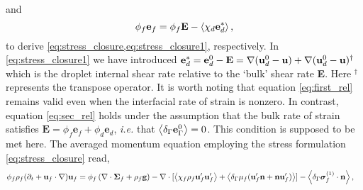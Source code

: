 and
\begin{equation}
\phi _f\textbf{e}_f
    = 
    \phi_f \textbf{E}
    - \avg{\chi_d \textbf{e}_d^*},
    \label{eq:sec_rel}
\end{equation}
to derive \ref{eq:stress_closure,eq:stress_closure1}, respectively. 
In \ref{eq:stress_closure1} we have introduced $\textbf{e}_d^* = \textbf{e}_d^0 - \textbf{E} = \mathbf{\nabla} (\textbf{u}_d^0-\textbf{u})+\mathbf{\nabla} (\textbf{u}_d^0-\textbf{u})^\dagger$ which is the droplet internal shear rate relative to the `bulk' shear rate \textbf{E}.
Here $^\dagger$ represents the transpose operator. 
It is worth noting that equation \ref{eq:first_rel} remains valid even when the interfacial rate of strain is nonzero. 
In contrast, equation \ref{eq:sec_rel} holds under the assumption that the bulk rate of strain satisfies $\textbf{E} = \phi_f \textbf{e}_f + \phi_d \textbf{e}_d$, \textit{i.e.} that $\left<\delta_\Gamma \textbf{e}_\Gamma^0\right> = 0$. 
This condition is supposed to be met here.
The averaged momentum equation  employing the stress formulation \ref{eq:stress_closure} read, 
\begin{align}
    \phi_f \rho_f(\pddt + \textbf{u}_f  \cdot \grad) \textbf{u}_f
    &= \phi_f 
    \left(\div \bm{\Sigma}_f
    + \rho_f \textbf{g}\right)
    - \div 
    [\avg{\chi_f\rho_f \textbf{u}_f'\textbf{u}_f'}
    +\avg{\delta_\Gamma \mu_f( \textbf{u}_f'  \textbf{n} +  \textbf{n} \textbf{u}_f')}]
    - \avg{\delta_\Gamma \bm\sigma_f^{(1)}\cdot \textbf{n}},
    \label{eq:two_fluid_momentum}
\end{align}
